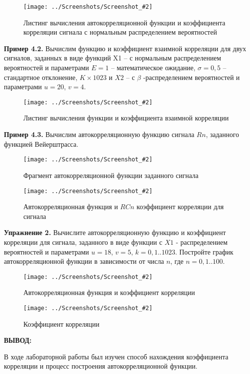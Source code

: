 \documentclass[14pt,a4paper]{extreport}
\newcommand{\sshot}[2]{\begin{figure}[ht]%
\centering\texttt{[image: ../Screenshots/Screenshot\_\#2]}%
\caption{#1}%
\label{sshot#2}%
\end{figure}%
}
\newcommand{\header}[1]{%
{
\clearpage%
\fontsize{16pt}{14pt}\selectfont
\begin{center}
\textbf{\MakeUppercase{#1}:}
\end{center}
}
}
\begin{document}
\sshot{Листинг вычисления автокорреляционной функции и коэффициента корреляции сигнала с нормальным распределением вероятностей}{1}

\clearpage

\textbf{Пример 4.2. } Вычислим функцию и коэффициент взаимной корреляции для 
двух сигналов, заданных в виде функций X1 – с нормальным распределением 
вероятностей и параметрами $E = 1$ – математическое ожидание, $\sigma = 0,5$ – 
стандартное отклонение, $K \times 1023$ и $X2$ – с $\beta$ -распределением вероятностей и параметрами $u = 20$, $v = 4$.
 
\sshot{Листинг вычисления функции и коэффициента взаимной корреляции}{2}

\clearpage

\textbf{Пример 4.3. } Вычислим автокорреляционную функцию сигнала $Rn$, заданного функцией Вейерштрасса.

\sshot{Фрагмент автокорреляционной функции заданного сигнала}{3}

\clearpage

\sshot{Автокорреляционная функция и $RCn$ коэффициент корреляции для сигнала}{4}
 
\textbf{Упражнение 2. } Вычислите автокорреляционную функцию и коэффициент корреляции для сигнала, заданного в виде функции с $X1$ - распределением вероятностей и 
параметрами $u = 18$, $v = 5$, $k = 0,1..1023$. Постройте график автокорреляционной функции в зависимости от числа $n$, где $n = 0,1..100$.

\clearpage
 
\sshot{Автокорреляционная функция и коэффициент корреляции}{5}
\sshot{Коэффициент корреляции}{6} 

\header{Вывод}

В ходе лабораторной работы был изучен способ нахождения 
коэффициента корреляции и процесс построения автокорреляционной 
функции.
\end{document}
